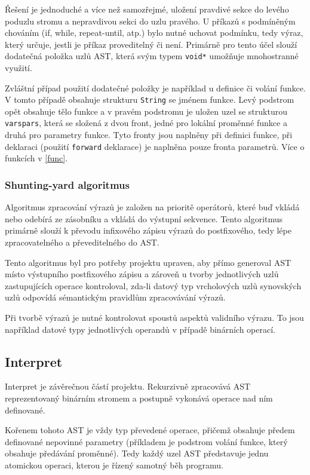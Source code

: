 \documentclass[12pt,a4paper,titlepage,final]{article}
\begin{document}
Řešení je jednoduché a více než samozřejmé, uložení pravdivé sekce do levého
poduzlu stromu a nepravdivou sekci do uzlu pravého. U příkazů s podmíněným
chováním (if, while, repeat-until, atp.) bylo nutné uchovat podmínku, tedy výraz,
který určuje, jestli je příkaz proveditelný či není. Primárně pro tento účel
slouží dodatečná položka uzlů AST, která svým typem \verb|void*| umožňuje
mnohostranné využití. 

Zvláštní případ použití dodatečné položky je například u definice či volání funkce.
V tomto případě obsahuje strukturu \verb|String| se jménem funkce. Levý podstrom
opět obsahuje tělo funkce a v pravém podstromu je uložen uzel se strukturou \verb|varspars|,
která se složená z dvou front, jedné pro lokální proměnné funkce a druhá pro
parametry funkce. Tyto fronty jsou naplněny při definici funkce, při deklaraci
(použití \verb|forward| deklarace) je naplněna pouze fronta parametrů. Více o funkcích
v \ref{func}.

\subsubsection{Shunting-yard algoritmus}
\label{sya}
Algoritmus zpracování výrazů je založen na prioritě operátorů, které buď vkládá
nebo odebírá ze zásobníku a vkládá do výstupní sekvence. Tento algoritmus primárně
slouží k převodu infixového zápisu výrazů do postfixového, tedy lépe zpracovatelného
a převeditelného do AST.

Tento algoritmus byl pro potřeby projektu upraven, aby přímo generoval AST místo
výstupního postfixového zápisu a zároveň u tvorby jednotlivých uzlů zastupujících
operace kontroloval, zda-li datový typ vrcholových uzlů synovských uzlů odpovídá
sémantickým pravidlům zpracovávání výrazů. 

Při tvorbě výrazů je nutné kontrolovat spoustů aspektů validního výrazu. To jsou
například datové typy jednotlivých operandů v případě binárních operací.

\subsection{Interpret} \label{interpret}

Interpret je závěrečnou částí projektu. Rekurzivně zpracovává AST reprezentovaný
binárním stromem a postupně vykonává operace nad ním definované.

Kořenem tohoto AST je vždy typ převedené operace, přičemž obsahuje předem
definované nepovinné parametry (příkladem je podstrom volání funkce, který
obsahuje předávání proměnné). Tedy každý uzel AST představuje jednu atomickou
operaci, kterou je řízený samotný běh programu.
\end{document}
